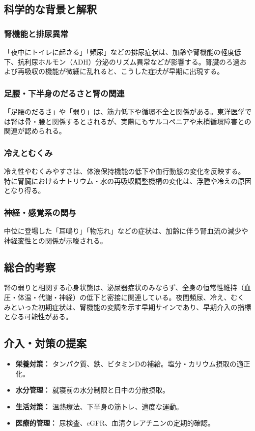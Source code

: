 \documentclass[a4paper,12pt]{article}
\begin{document}
\subsection*{科学的な背景と解釈}

\subsubsection*{腎機能と排尿異常}
「夜中にトイレに起きる」「頻尿」などの排尿症状は、加齢や腎機能の軽度低下、抗利尿ホルモン（ADH）分泌のリズム異常などが影響する。腎臓のろ過および再吸収の機能が微細に乱れると、こうした症状が早期に出現する。

\subsubsection*{足腰・下半身のだるさと腎の関連}
「足腰のだるさ」や「弱り」は、筋力低下や循環不全と関係がある。東洋医学では腎は骨・腰と関係するとされるが、実際にもサルコペニアや末梢循環障害との関連が認められる。

\subsubsection*{冷えとむくみ}
冷え性やむくみやすさは、体液保持機能の低下や血行動態の変化を反映する。特に腎臓におけるナトリウム・水の再吸収調整機構の変化は、浮腫や冷えの原因となり得る。

\subsubsection*{神経・感覚系の関与}
中位に登場した「耳鳴り」「物忘れ」などの症状は、加齢に伴う腎血流の減少や神経変性との関係が示唆される。

\subsection*{総合的考察}

腎の弱りと相関する心身状態は、泌尿器症状のみならず、全身の恒常性維持（血圧・体温・代謝・神経）の低下と密接に関連している。夜間頻尿、冷え、むくみといった初期症状は、腎機能の変調を示す早期サインであり、早期介入の指標となる可能性がある。

\subsection*{介入・対策の提案}

\begin{itemize}
  \item \textbf{栄養対策：} タンパク質、鉄、ビタミンDの補給。塩分・カリウム摂取の適正化。
  \item \textbf{水分管理：} 就寝前の水分制限と日中の分散摂取。
  \item \textbf{生活対策：} 温熱療法、下半身の筋トレ、適度な運動。
  \item \textbf{医療的管理：} 尿検査、eGFR、血清クレアチニンの定期的確認。
\end{itemize}
\end{document}
